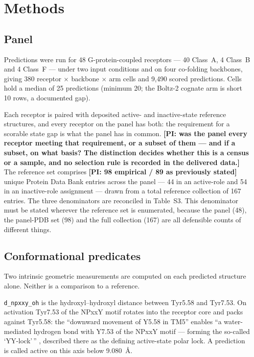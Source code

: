 
\section*{Methods}

\subsection*{Panel}

Predictions were run for 48 G-protein-coupled receptors --- 40 Class~A, 4
Class~B and 4 Class~F --- under two input conditions and on four co-folding
backbones, giving 380 receptor $\times$ backbone $\times$ arm cells and 9{,}490
scored predictions. Cells hold a median of 25 predictions (minimum 20; the
Boltz-2 cognate arm is short 10 rows, a documented gap).

Each receptor is paired with deposited active- and inactive-state reference
structures, and every receptor on the panel has both: the requirement for a
scorable state gap is what the panel has in common.
\textbf{[PI: was the panel every receptor meeting that requirement, or a subset
of them --- and if a subset, on what basis? The distinction decides whether this
is a census or a sample, and no selection rule is recorded in the delivered
data.]} The reference set comprises \textbf{[PI: 98 empirical / 89 as
previously stated]} unique Protein Data Bank entries across the panel --- 44 in
an active-role and 54 in an inactive-role assignment --- drawn from a total
reference collection of 167 entries. The three denominators are reconciled in
Table~S3. This denominator must be stated wherever the reference set is
enumerated, because the panel (48), the panel-PDB set (98) and the full
collection (167) are all defensible counts of different things.

\subsection*{Conformational predicates}

Two intrinsic geometric measurements are computed on each predicted structure
alone. Neither is a comparison to a reference.

\texttt{d\_npxxy\_oh} is the hydroxyl--hydroxyl distance between Tyr5.58 and
Tyr7.53. On activation Tyr7.53 of the NPxxY motif rotates into the receptor core
and packs against Tyr5.58: the ``downward movement of Y5.58 in TM5'' enables ``a
water-mediated hydrogen bond with Y7.53 of the NPxxY motif --- forming the
so-called `YY-lock'\,'' \citep[p.~3714]{georgiou2025heterogeneity}, described there
as the defining active-state polar lock. A prediction is called active on this
axis below 9.080~\AA.

